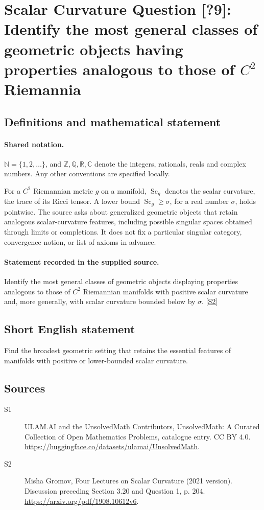 \documentclass[11pt]{article}
\newcommand{\sref}[2]{\hyperlink{source:#1:#2}{[S#2]}}
\begin{document}
\section{Scalar Curvature Question [?9]: Identify the most general classes of geometric objects having properties analogous to those of $C^2$ Riemannia}\label{statement}

\subsection{Definitions and mathematical statement}

\paragraph{Shared notation.}$\mathbb N=\{1,2,\ldots\}$, and $\mathbb Z,\mathbb Q,\mathbb R,\mathbb C$ denote the integers, rationals, reals and complex numbers. Any other conventions are specified locally.


For a $C^2$ Riemannian metric $g$ on a manifold, $\operatorname{Sc}_g$ denotes the scalar curvature, the trace of its Ricci tensor. A lower bound $\operatorname{Sc}_g\geq\sigma$, for a real number $\sigma$, holds pointwise. The source asks about generalized geometric objects that retain analogous scalar-curvature features, including possible singular spaces obtained through limits or completions. It does not fix a particular singular category, convergence notion, or list of axioms in advance.
\paragraph{Statement recorded in the supplied source.}
Identify the most general classes of geometric objects displaying properties analogous to those of $C^2$ Riemannian manifolds with positive scalar curvature and, more generally, with scalar curvature bounded below by $\sigma$. \sref{statement}{2}
\subsection{Short English statement}
Find the broadest geometric setting that retains the essential features of manifolds with positive or lower-bounded scalar curvature.
\subsection{Sources}
\begin{description}
\item[\hypertarget{source:statement:1}{S1}] ULAM.AI and the UnsolvedMath Contributors, UnsolvedMath: A Curated Collection of Open Mathematics Problems, catalogue entry. CC BY 4.0. \url{https://huggingface.co/datasets/ulamai/UnsolvedMath}.
\item[\hypertarget{source:statement:2}{S2}] Misha Gromov, Four Lectures on Scalar Curvature (2021 version). Discussion preceding Section 3.20 and Question 1, p. 204. \url{https://arxiv.org/pdf/1908.10612v6}.
\end{description}
\label{end:statement}
\end{document}
